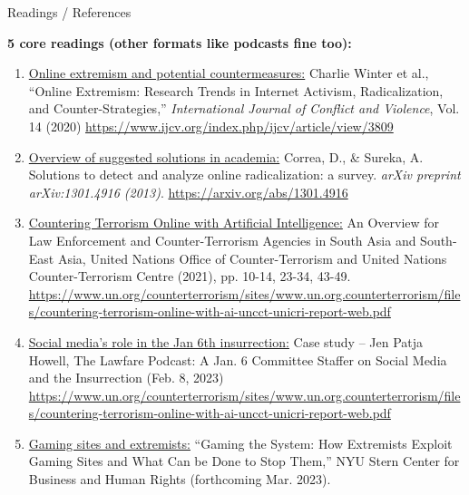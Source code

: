 \documentclass[nobackground,dvipsnames,table]{beamer}
\begin{document}
\begin{frame}{Readings / References}
\tiny{
\textbf{5 core readings (other formats like podcasts fine too): }

\begin{enumerate}
    \item \underline{Online extremism and potential countermeasures:} \newline 
Charlie Winter et al., “Online Extremism: Research Trends in Internet Activism, Radicalization, and Counter-Strategies,” \emph{International Journal of Conflict and Violence}, Vol. 14 (2020) \url{https://www.ijcv.org/index.php/ijcv/article/view/3809}
    \item \underline{Overview of suggested solutions in academia:} \newline 
Correa, D., \& Sureka, A. Solutions to detect and analyze online radicalization: a survey. \emph{arXiv preprint arXiv:1301.4916 (2013)}. \url{https://arxiv.org/abs/1301.4916}
    \item \underline{Countering Terrorism Online with Artificial Intelligence:} \newline  
An Overview for Law Enforcement and Counter-Terrorism Agencies in South Asia and South-East Asia, United Nations Office of Counter-Terrorism and United Nations Counter-Terrorism Centre (2021), pp. 10-14, 23-34, 43-49. \url{https://www.un.org/counterterrorism/sites/www.un.org.counterterrorism/files/countering-terrorism-online-with-ai-uncct-unicri-report-web.pdf}
    \item \underline{Social media’s role in the Jan 6th insurrection:} \newline 
Case study – Jen Patja Howell, The Lawfare Podcast: A Jan. 6 Committee Staffer on Social Media and the Insurrection (Feb. 8, 2023) \url{https://www.un.org/counterterrorism/sites/www.un.org.counterterrorism/files/countering-terrorism-online-with-ai-uncct-unicri-report-web.pdf}
    \item \underline{Gaming sites and extremists:} \newline 
“Gaming the System: How Extremists Exploit Gaming Sites and What Can be Done to Stop Them,” NYU Stern Center for Business and Human Rights (forthcoming Mar. 2023).
\end{enumerate}
}
\end{frame}
\end{document}
